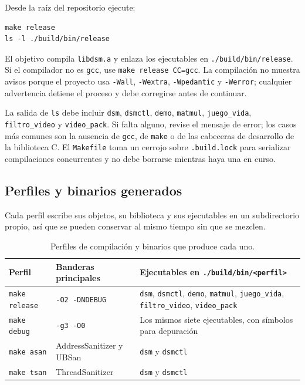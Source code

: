 Desde la raíz del repositorio ejecute:

\begin{lstlisting}
make release
ls -l ./build/bin/release
\end{lstlisting}

El objetivo compila \texttt{libdsm.a} y enlaza los ejecutables en \texttt{./build/bin/release}. Si el compilador no es \texttt{gcc}, use \texttt{make release CC=gcc}. La compilación no muestra avisos porque el proyecto usa \texttt{-Wall}, \texttt{-Wextra}, \texttt{-Wpedantic} y \texttt{-Werror}; cualquier advertencia detiene el proceso y debe corregirse antes de continuar.

La salida de \texttt{ls} debe incluir \texttt{dsm}, \texttt{dsmctl}, \texttt{demo}, \texttt{matmul}, \texttt{juego\_vida}, \texttt{filtro\_video} y \texttt{video\_pack}. Si falta alguno, revise el mensaje de error; los casos más comunes son la ausencia de \texttt{gcc}, de \texttt{make} o de las cabeceras de desarrollo de la biblioteca C. El \texttt{Makefile} toma un cerrojo sobre \texttt{.build.lock} para serializar compilaciones concurrentes y no debe borrarse mientras haya una en curso.

\subsection{Perfiles y binarios generados}\label{subsec:perfiles}

Cada perfil escribe sus objetos, su biblioteca y sus ejecutables en un subdirectorio propio, así que se pueden conservar al mismo tiempo sin que se mezclen.

\begin{table}[H]
\centering
\small
\caption{Perfiles de compilación y binarios que produce cada uno.}
\label{tab:perfiles}
\begin{tabularx}{\textwidth}{@{}l l Y@{}}
\toprule
Perfil & Banderas principales & Ejecutables en \texttt{./build/bin/<perfil>} \\
\midrule
\texttt{make release} & \texttt{-O2 -DNDEBUG} & \texttt{dsm}, \texttt{dsmctl}, \texttt{demo}, \texttt{matmul}, \texttt{juego\_vida}, \texttt{filtro\_video}, \texttt{video\_pack} \\
\texttt{make debug} & \texttt{-g3 -O0} & Los mismos siete ejecutables, con símbolos para depuración \\
\texttt{make asan} & AddressSanitizer y UBSan & \texttt{dsm} y \texttt{dsmctl} \\
\texttt{make tsan} & ThreadSanitizer & \texttt{dsm} y \texttt{dsmctl} \\
\bottomrule
\end{tabularx}
\end{table}


